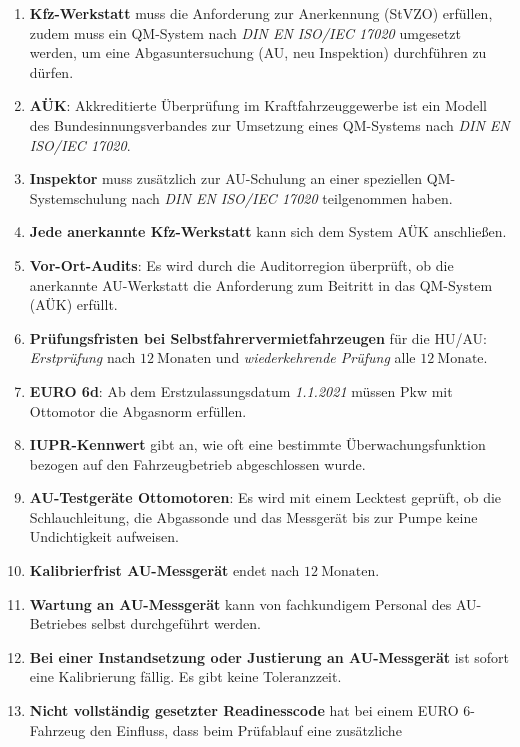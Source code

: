 \documentclass{vorlage-design-main}
\begin{document}
\begin{enumerate}
\def\labelenumi{\arabic{enumi}.}

\item
  \textbf{Kfz-Werkstatt} muss die Anforderung zur Anerkennung (StVZO)
  erfüllen, zudem muss ein QM-System nach \emph{DIN EN ISO/IEC 17020}
  umgesetzt werden, um eine Abgasuntersuchung (AU, neu Inspektion)
  durchführen zu dürfen.
\item
  \textbf{AÜK}: Akkreditierte Überprüfung im Kraftfahrzeuggewerbe ist
  ein Modell des Bundesinnungsverbandes zur Umsetzung eines QM-Systems
  nach \emph{DIN EN ISO/IEC 17020}.
\item
  \textbf{Inspektor} muss zusätzlich zur AU-Schulung an einer speziellen
  QM-Systemschulung nach \emph{DIN EN ISO/IEC 17020} teilgenommen haben.
\item
  \textbf{Jede anerkannte Kfz-Werkstatt} kann sich dem System AÜK
  anschließen.
\item
  \textbf{Vor-Ort-Audits}: Es wird durch die Auditorregion überprüft, ob
  die anerkannte AU-Werkstatt die Anforderung zum Beitritt in das
  QM-System (AÜK) erfüllt.
\item
  \textbf{Prüfungsfristen bei Selbstfahrervermietfahrzeugen} für die
  HU/AU: \emph{Erstprüfung} nach $\boxed{12~\text{Monaten}}$ und
  \emph{wiederkehrende Prüfung} alle $\boxed{12~\text{Monate}}$.
\item
  \textbf{EURO 6d}: Ab dem Erstzulassungsdatum \emph{1.1.2021} müssen
  Pkw mit Ottomotor die Abgasnorm erfüllen.
\item
  \textbf{IUPR-Kennwert} gibt an, wie oft eine bestimmte
  Überwachungsfunktion bezogen auf den Fahrzeugbetrieb abgeschlossen
  wurde.
\item
  \textbf{AU-Testgeräte Ottomotoren}: Es wird mit einem Lecktest
  geprüft, ob die Schlauchleitung, die Abgassonde und das Messgerät bis
  zur Pumpe keine Undichtigkeit aufweisen.
\item
  \textbf{Kalibrierfrist AU-Messgerät} endet nach
  $\boxed{12~\text{Monaten}}$.
\item
  \textbf{Wartung an AU-Messgerät} kann von fachkundigem Personal des
  AU-Betriebes selbst durchgeführt werden.
\item
  \textbf{Bei einer Instandsetzung oder Justierung an AU-Messgerät} ist
  sofort eine Kalibrierung fällig. Es gibt keine Toleranzzeit.
\item
  \textbf{Nicht vollständig gesetzter Readinesscode} hat bei einem EURO
  6-Fahrzeug den Einfluss, dass beim Prüfablauf eine zusätzliche

\end{enumerate}
\end{document}
